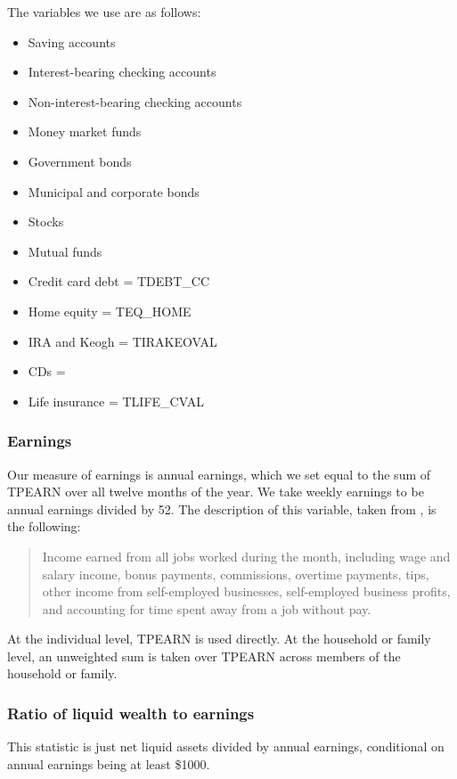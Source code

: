 \documentclass{article}
\begin{document}
The variables we use are as follows:
\begin{itemize}
\item Saving accounts \eqindent {}
\item Interest-bearing checking accounts\eqindent  {}
\item Non-interest-bearing checking accounts\eqindent  {}
\item Money market funds\eqindent  {}
\item Government bonds\eqindent  {}
\item Municipal and corporate bonds\eqindent  {}
\item Stocks\eqindent  {}
\item Mutual funds\eqindent  {}
\item Credit card debt = TDEBT\_CC
\item Home equity = TEQ\_HOME
\item IRA and Keogh = TIRAKEOVAL
\item CDs = 
\item Life insurance = TLIFE\_CVAL
\end{itemize}

\subsubsection{Earnings}
Our measure of earnings is annual earnings, which we set equal to the sum of TPEARN over all twelve months of the year. We take weekly earnings to be annual earnings divided by 52. The description of this variable, taken from \cite{tpearn}, is the following:
\begin{quote}
Income earned from all jobs worked during the month, including wage and salary income, bonus payments, commissions, overtime payments, tips, other income from self-employed businesses, self-employed business profits, and accounting for time spent away from a job without pay.
\end{quote}

At the individual level, TPEARN is used directly. At the household or family level, an unweighted sum is taken over TPEARN across members of the household or family.

\subsubsection{Ratio of liquid wealth to earnings}
This statistic is just net liquid assets divided by annual earnings, conditional on annual earnings being at least \$1000.
\end{document}
